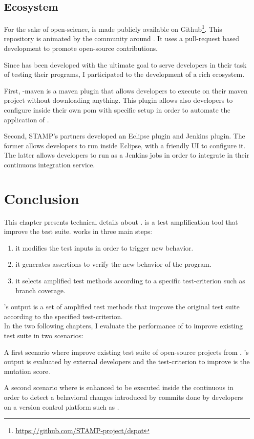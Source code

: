 \subsection{Ecosystem}
\label{subsec:dspot:implemention:ecosystem}

For the sake of open-science, \dspot is made publicly available on Github\footnote{\url{https://github.com/STAMP-project/dspot}}.
This repository is animated by the community around \dspot.
It uses a pull-request based development to promote open-source contributions.

Since \dspot has been developed with the ultimate goal to serve developers in their task of testing their programs, I participated to the development of a rich ecosystem.

First, \dspot-maven is a maven plugin that allows developers to execute \dspot on their maven project without downloading anything.
This plugin allows also developers to configure \dspot inside their own pom with specific setup in order to automate the application of \dspot.

Second, STAMP's partners developed an Eclipse plugin and Jenkins plugin. 
The former allows developers to run \dspot inside Eclipse, with a friendly UI to configure it. 
The latter allows developers to run \dspot as a Jenkins jobs in order to integrate \dspot in their continuous integration service.

\section{Conclusion}
\label{sec:dspot:conclusion}

This chapter presents technical details about \dspot.
\dspot is a test amplification tool that improve the test suite.
\dspot works in three main steps:
\begin{enumerate}
	\item it modifies the test inputs in order to trigger new behavior.
	\item it generates assertions to verify the new behavior of the program.
	\item it selects amplified test methods according to a specific test-criterion such as branch coverage.
\end{enumerate}

\dspot's output is a set of amplified test methods that improve the original test suite according to the specified test-criterion.\\

In the two following chapters, I evaluate the performance of \dspot to improve existing test suite in two scenarios:

A first scenario where \dspot improve existing test suite of open-source projects from \gh.
\dspot's output is evaluated by external developers and the test-criterion to improve is the mutation score.

A second scenario where \dspot is enhanced to be executed inside the continuous in order to detect a behavioral changes introduced by commits done by developers on a version control platform such as \gh.